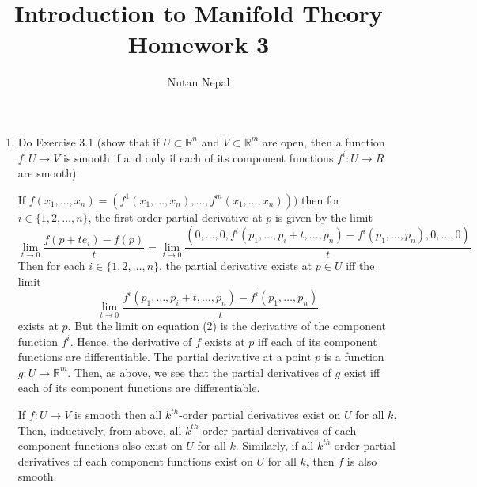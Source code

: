 \documentclass[12pt]{article}
\title{\textbf{Introduction to Manifold Theory} \\
\large Homework 3
}
\author{Nutan Nepal}
\newcommand{\rl}{\mathbb{R}}
\begin{document}
\maketitle
\makebox[\linewidth]{\rule{200mm}{1pt}}
\vspace{1mm}

\begin{enumerate}

\item Do Exercise 3.1 (show that if
    $U\subset \rl^n$ and $V\subset \rl^m$
    are open, then a function $f:U\to V$
    is smooth if
    and only if each of its component
    functions $f^i : U\to R$ are smooth).

\begin{mybox}

    If $f(x_1,\ldots,x_n)=
    (f^1(x_1,\ldots,x_n),\ldots,f^m(x_1,\ldots,x_n)))$
    then for $i\in \{1,2,\ldots,n\}$, the first-order
    partial derivative at $p$ is given by the limit
    \begin{equation}
        \lim_{t\to 0}{\frac{f(p+te_i)-f(p)}{t}}
        =\lim_{t\to 0}{\frac{
            (0,\ldots,0,f^i(p_1,\ldots,p_i+t,\ldots,p_n)
            -f^i(p_1,\ldots,p_n)
            ,0,\ldots,0)
        }{t}}
    \end{equation}
    Then for each $i\in \{1,2,\ldots,n\}$,
    the partial derivative exists at
    $p\in U$ iff the
    limit
    \begin{equation}
        \lim_{t\to 0}{\frac{
            f^i(p_1,\ldots,p_i+t,\ldots,p_n)
            -f^i(p_1,\ldots,p_n)
        }{t}}
    \end{equation}
    exists at $p$. But the limit on equation (2)
    is the derivative of the component function
    $f^i$. Hence, the derivative of $f$ exists at
    $p$ iff each of its component functions
    are differentiable. The partial derivative at
    a point $p$ is a function $g:U\to \rl^m$.
    Then, as above, we see that the partial
    derivatives of $g$ exist iff each of its
    component functions are differentiable.

    \vspace*{3mm}
    If $f:U\to V$ is smooth then all $k^{th}$-order
    partial derivatives exist on $U$ for all $k$.
    Then, inductively, from above,
    all $k^{th}$-order
    partial derivatives of each component functions
    also exist on $U$ for all $k$.
    Similarly, if all $k^{th}$-order
    partial derivatives of each component functions
     exist on $U$ for all $k$,
    then $f$ is also smooth.
\end{mybox}



\end{enumerate}
\end{document}

